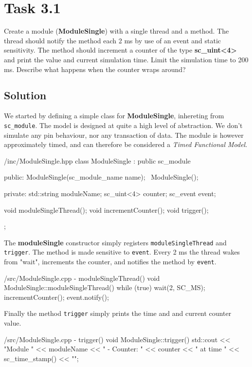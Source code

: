 \documentclass[../main.tex]{subfiles}
\begin{document}
\section{Task 3.1}

Create a module (\textbf{ModuleSingle}) with a single thread and a method. The thread should notify the method each 2 ms by use of an event and static sensitivity. The method should increment a counter of the type \textbf{sc\_uint<4>} and print the value and current simulation time. Limit the simulation time to 200 ms. Describe what happens when the counter wraps around?

\subsection*{Solution}

We started by defining a simple class for \textbf{ModuleSingle}, inhereting from \texttt{sc\_module}.  The model is designed at quite a high level of abstraction. We don't simulate any pin behaviour, nor any transaction of data. The module is however approximately timed, and can therefore be considered a \textit{Timed Functional Model}.

\begin{myminted}{/inc/ModuleSingle.hpp}
class ModuleSingle : public sc_module {
public:
    ModuleSingle(sc_module_name name);
    ~ModuleSingle();

private:
    std::string moduleName;
    sc_uint<4> counter;
    sc_event event;

    void moduleSingleThread();
    void incrementCounter();
    void trigger();
};
\end{myminted}

The \textbf{moduleSingle} constructor simply registers \texttt{moduleSingleThread} and \texttt{trigger}. The method is made sensitive to \texttt{event}. Every 2 ms the thread wakes from "wait", increments the counter, and notifies the method by \texttt{event}.

\begin{myminted}{/src/ModuleSingle.cpp - moduleSingleThread()}
void ModuleSingle::moduleSingleThread() {
    while (true) {
        wait(2, SC_MS); 
        incrementCounter();
        event.notify();
    }
}
\end{myminted}

\newpage

Finally the method \texttt{trigger} simply prints the time and and current counter value.

\begin{myminted}{/src/ModuleSingle.cpp - trigger()}
void ModuleSingle::trigger() {
    std::cout << "Module " << moduleName << " - Counter: " << counter
                << " at time " << sc_time_stamp() << "\n";
}
\end{myminted}
\end{document}
